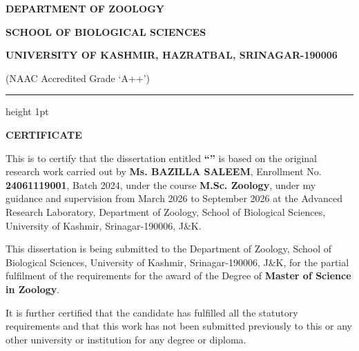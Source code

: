 
\clearpage
\thispagestyle{frontmatterstyle}
\begin{center}
{\bfseries DEPARTMENT OF ZOOLOGY\par}
{\bfseries SCHOOL OF BIOLOGICAL SCIENCES\par}
{\bfseries UNIVERSITY OF KASHMIR, HAZRATBAL, SRINAGAR-190006\par}
{\footnotesize (NAAC Accredited Grade `A++')\par}
\vspace{0.15in}
\hrule height 1pt
\vspace{0.3in}
{\Large \bfseries CERTIFICATE\par}
\vspace{0.3in}
\end{center}

\noindent This is to certify that the dissertation entitled \textbf{``\distitlecite''} is based on the original research work carried out by \textbf{Ms. BAZILLA SALEEM}, Enrollment No. \textbf{24061119001}, Batch 2024, under the course \textbf{M.Sc. Zoology}, under my guidance and supervision from March 2026 to September 2026 at the Advanced Research Laboratory, Department of Zoology, School of Biological Sciences, University of Kashmir, Srinagar-190006, J\&K.

\vspace{0.2in}

\noindent This dissertation is being submitted to the Department of Zoology, School of Biological Sciences, University of Kashmir, Srinagar-190006, J\&K, for the partial fulfilment of the requirements for the award of the Degree of \textbf{Master of Science in Zoology}.

\vspace{0.2in}

\noindent It is further certified that the candidate has fulfilled all the statutory requirements and that this work has not been submitted previously to this or any other university or institution for any degree or diploma.

\vspace{1.5in}

